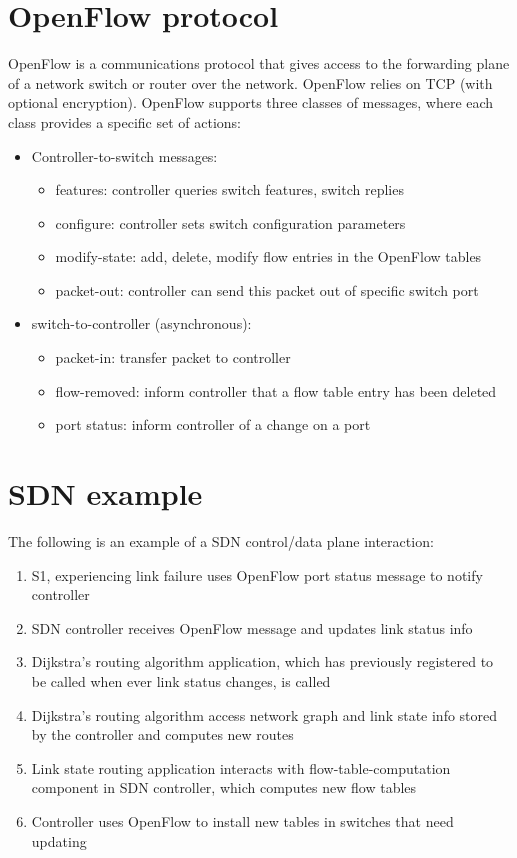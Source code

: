 \section{OpenFlow protocol}
OpenFlow is a communications protocol that gives access to the forwarding plane of a network switch or router over the network. OpenFlow relies on TCP (with optional encryption). OpenFlow supports three classes of messages, where each class provides a specific set of actions:
\begin{itemize}
  \item Controller-to-switch messages:
  \begin{itemize}
    \item features: controller queries switch features, switch replies
    \item configure: controller sets switch configuration parameters
    \item modify-state: add, delete, modify flow entries in the OpenFlow tables
    \item packet-out: controller can send this packet out of specific switch port
  \end{itemize}
  \item switch-to-controller (asynchronous):
  \begin{itemize}
    \item packet-in: transfer packet to controller
    \item flow-removed: inform controller that a flow table entry has been deleted
    \item port status: inform controller of a change on a port
  \end{itemize}
\end{itemize}

\section{SDN example}
The following is an example of a SDN control/data plane interaction:
\begin{enumerate}
  \item S1, experiencing link failure uses OpenFlow port status message to notify controller
  \item SDN controller receives OpenFlow message and updates link status info
  \item Dijkstra's routing algorithm application, which has previously registered to be called when ever link status changes, is called
  \item Dijkstra's routing algorithm access network graph and link state info stored by the controller and computes new routes
  \item Link state routing application interacts with flow-table-computation component in SDN controller, which computes new flow tables
  \item Controller uses OpenFlow to install new tables in switches that need updating
\end{enumerate}

